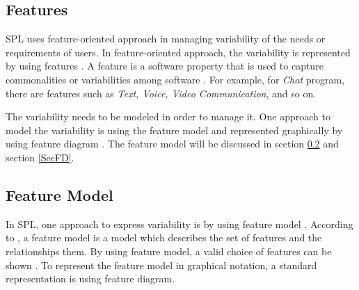 \subsection{Features}\label{SecFeatures}
SPL uses feature-oriented approach in managing variability of the needs or requirements of users. In feature-oriented approach, the variability is represented by using features \citep{paper.kastnerApel.FeatureOrientedSoftwareDevelopment}. A feature is a software property that is used to capture commonalities or variabilities among software \citep{paper.czarnecki2005.mappingFeatureToModels}. For example, for {\it Chat} program, there are features such as {\it Text, Voice, Video Communication}, and so on.

The variability needs to be modeled in order to manage it. One approach to model the variability is using the feature model \citep{book.apel.FeatureOrientedSoftware,paper.kastnerApel.FeatureOrientedSoftwareDevelopment} and represented graphically by using feature diagram \citep{book.apel.FeatureOrientedSoftware}. The feature model will be discussed in section \ref{SecFM} and section \ref{SecFD}.

\subsection{Feature Model}\label{SecFM}
In SPL, one approach to express variability is by using feature model \citep{book.apel.FeatureOrientedSoftware}. According to \citep{paper.kastnerApel.FeatureOrientedSoftwareDevelopment}, a feature model is a model which describes the set of features and the relationships them. By using feature model, a valid choice of features can be shown \citep{book.apel.FeatureOrientedSoftware}. To represent the feature model in graphical notation, a standard representation is using feature diagram.

